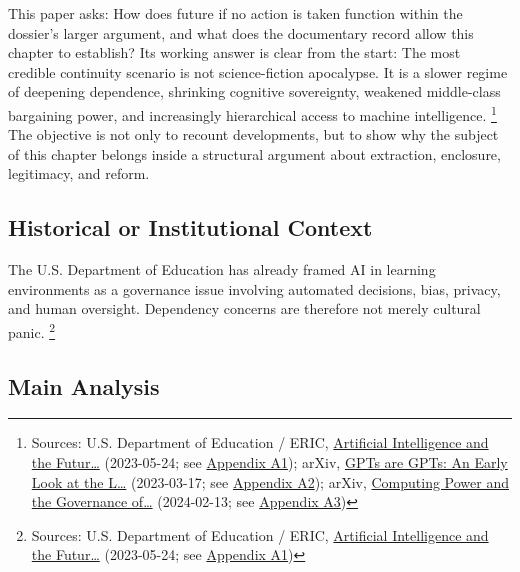 \documentclass[
  american,
  11pt,
  letterpaper,
]{article}
\begin{document}
This paper asks: How does future if no action is taken function within
the dossier's larger argument, and what does the documentary record
allow this chapter to establish? Its working answer is clear from the
start: The most credible continuity scenario is not science-fiction
apocalypse. It is a slower regime of deepening dependence, shrinking
cognitive sovereignty, weakened middle-class bargaining power, and
increasingly hierarchical access to machine intelligence. \footnote{Sources:
  U.S. Department of Education / ERIC,
  \href{https://eric.ed.gov/?id=ED631097}{Artificial Intelligence and
  the Futur\ldots{}} (2023-05-24; see
  \hyperref[appendix-a1-artificial-intelligence-and-the-future-of-teaching-and-learning-insights-and-recommendations]{Appendix
  A1}); arXiv, \href{https://arxiv.org/abs/2303.10130}{GPTs are GPTs: An
  Early Look at the L\ldots{}} (2023-03-17; see
  \hyperref[appendix-a2-gpts-are-gpts-an-early-look-at-the-labor-market-impact-potential-of-large-language-models]{Appendix
  A2}); arXiv, \href{https://arxiv.org/abs/2402.08797}{Computing Power
  and the Governance of\ldots{}} (2024-02-13; see
  \hyperref[appendix-a3-computing-power-and-the-governance-of-artificial-intelligence]{Appendix
  A3})} The objective is not only to recount developments, but to show
why the subject of this chapter belongs inside a structural argument
about extraction, enclosure, legitimacy, and reform.

\subsection{Historical or Institutional
Context}\label{historical-or-institutional-context}

The U.S. Department of Education has already framed AI in learning
environments as a governance issue involving automated decisions, bias,
privacy, and human oversight. Dependency concerns are therefore not
merely cultural panic. \footnote{Sources: U.S. Department of Education /
  ERIC, \href{https://eric.ed.gov/?id=ED631097}{Artificial Intelligence
  and the Futur\ldots{}} (2023-05-24; see
  \hyperref[appendix-a1-artificial-intelligence-and-the-future-of-teaching-and-learning-insights-and-recommendations]{Appendix
  A1})}

\subsection{Main Analysis}\label{main-analysis}
\end{document}
